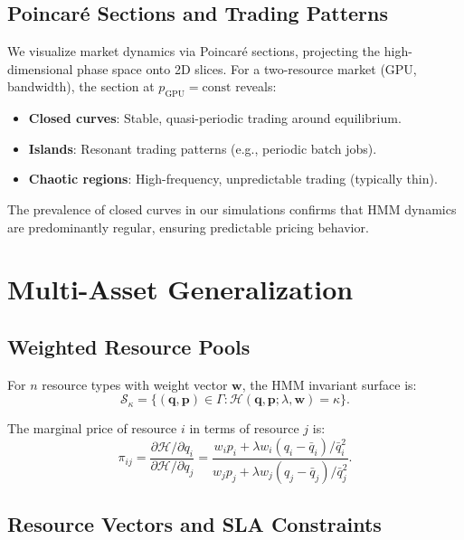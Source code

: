 \documentclass[11pt,twocolumn]{article}
\begin{document}
\subsection{Poincar\'e Sections and Trading Patterns}

We visualize market dynamics via Poincar\'e sections, projecting the high-dimensional phase space onto 2D slices. For a two-resource market (GPU, bandwidth), the section at $p_{\text{GPU}} = \text{const}$ reveals:

\begin{itemize}[leftmargin=1.1em]
    \item \textbf{Closed curves}: Stable, quasi-periodic trading around equilibrium.
    \item \textbf{Islands}: Resonant trading patterns (e.g., periodic batch jobs).
    \item \textbf{Chaotic regions}: High-frequency, unpredictable trading (typically thin).
\end{itemize}

The prevalence of closed curves in our simulations confirms that HMM dynamics are predominantly regular, ensuring predictable pricing behavior.

\section{Multi-Asset Generalization}
\label{sec:multiasset}

\subsection{Weighted Resource Pools}

For $n$ resource types with weight vector $\bm{w}$, the HMM invariant surface is:
\begin{equation}
\mathcal{S}_\kappa = \{(\bm{q}, \bm{p}) \in \Gamma : \mathcal{H}(\bm{q}, \bm{p}; \lambda, \bm{w}) = \kappa\}.
\end{equation}

The marginal price of resource $i$ in terms of resource $j$ is:
\begin{equation}
\pi_{ij} = \frac{\partial \mathcal{H}/\partial q_i}{\partial \mathcal{H}/\partial q_j} = \frac{w_i p_i + \lambda w_i (q_i - \bar{q}_i)/\bar{q}_i^2}{w_j p_j + \lambda w_j (q_j - \bar{q}_j)/\bar{q}_j^2}.
\end{equation}

\subsection{Resource Vectors and SLA Constraints}
\end{document}

